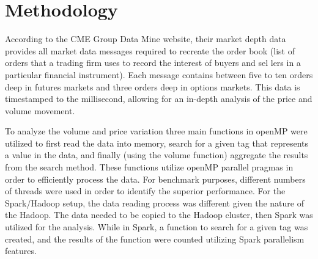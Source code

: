 \documentclass[12pt]{article} %
\begin{document}
\section{Methodology}



According to the CME Group Data Mine website, their market depth data provides all market data messages required to recreate the order book (list of orders that a trading firm uses to record the interest of buyers and sel	lers in a particular financial instrument). Each message contains between five to ten orders deep in futures markets and three orders deep in options markets. This data is timestamped to the millisecond, allowing for an in-depth analysis of the price and volume movement. 

To analyze the volume and price variation three main functions in openMP were utilized to first read the data into memory, search for a given tag that represents a value in the data, and finally (using the volume function) aggregate the results from the search method. These functions utilize openMP parallel pragmas in order to efficiently process the data. For benchmark purposes, different numbers of threads were used in order to identify the superior performance. For the Spark/Hadoop setup, the data reading process was different given the nature of the Hadoop. The data needed to be copied to the Hadoop cluster, then Spark was utilized for the analysis. While in Spark, a function to search for a given tag was created, and the results of the function were counted utilizing Spark parallelism features. 
\end{document}
